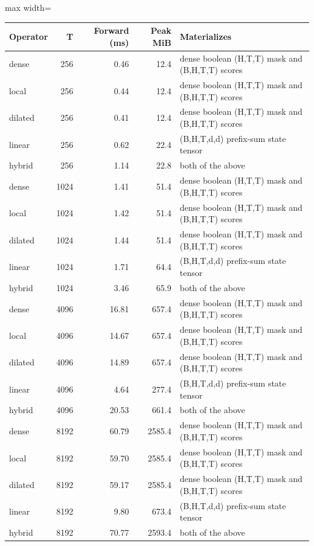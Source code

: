 \scriptsize
\setlength{\tabcolsep}{3.5pt}
\label{tab:t2bsweep}
\begin{adjustbox}{max width=\linewidth}
\begin{tabular}{lrrrp{6.2cm}}
\toprule
Operator & T & Forward (ms) & Peak MiB & Materializes \\
\midrule
dense & 256 & 0.46 & 12.4 & dense boolean (H,T,T) mask and (B,H,T,T) scores \\
local & 256 & 0.44 & 12.4 & dense boolean (H,T,T) mask and (B,H,T,T) scores \\
dilated & 256 & 0.41 & 12.4 & dense boolean (H,T,T) mask and (B,H,T,T) scores \\
linear & 256 & 0.62 & 22.4 & (B,H,T,d,d) prefix-sum state tensor \\
hybrid & 256 & 1.14 & 22.8 & both of the above \\
dense & 1024 & 1.41 & 51.4 & dense boolean (H,T,T) mask and (B,H,T,T) scores \\
local & 1024 & 1.42 & 51.4 & dense boolean (H,T,T) mask and (B,H,T,T) scores \\
dilated & 1024 & 1.44 & 51.4 & dense boolean (H,T,T) mask and (B,H,T,T) scores \\
linear & 1024 & 1.71 & 64.4 & (B,H,T,d,d) prefix-sum state tensor \\
hybrid & 1024 & 3.46 & 65.9 & both of the above \\
dense & 4096 & 16.81 & 657.4 & dense boolean (H,T,T) mask and (B,H,T,T) scores \\
local & 4096 & 14.67 & 657.4 & dense boolean (H,T,T) mask and (B,H,T,T) scores \\
dilated & 4096 & 14.89 & 657.4 & dense boolean (H,T,T) mask and (B,H,T,T) scores \\
linear & 4096 & 4.64 & 277.4 & (B,H,T,d,d) prefix-sum state tensor \\
hybrid & 4096 & 20.53 & 661.4 & both of the above \\
dense & 8192 & 60.79 & 2585.4 & dense boolean (H,T,T) mask and (B,H,T,T) scores \\
local & 8192 & 59.70 & 2585.4 & dense boolean (H,T,T) mask and (B,H,T,T) scores \\
dilated & 8192 & 59.17 & 2585.4 & dense boolean (H,T,T) mask and (B,H,T,T) scores \\
linear & 8192 & 9.80 & 673.4 & (B,H,T,d,d) prefix-sum state tensor \\
hybrid & 8192 & 70.77 & 2593.4 & both of the above \\
\bottomrule
\end{tabular}
\end{adjustbox}
